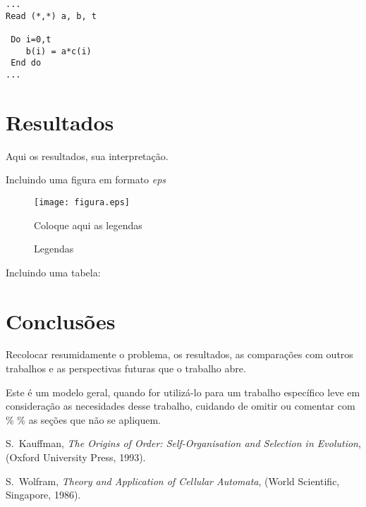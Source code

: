 \begin{verbatim}
...
Read (*,*) a, b, t

 Do i=0,t
    b(i) = a*c(i)
 End do
...

\end{verbatim}

\section{Resultados}
\vspace{2cm}
 Aqui os resultados, sua interpretação.

Incluindo uma figura em formato {\it eps}

\begin{figure}[hbtp]
\begin{center}
\texttt{[image: figura.eps]}
\caption{Coloque aqui as legendas}
\label{fig}
\end{center}
\end{figure}
\vspace{0.5cm}

\begin{figure}[htbp]
\begin{center}
\caption{Legendas}
\label{fig_rotacao}
\end{center}
\end{figure}



Incluindo uma tabela:

\section{Conclusões}
Recolocar resumidamente o problema, os resultados, as comparações \cite{Wolfram_book} com outros
trabalhos e as perspectivas futuras que o trabalho abre.

{\color{red} Este é um modelo geral, quando for utilizá-lo para um trabalho
específico leve em consideração as necesidades desse trabalho,
cuidando de omitir ou comentar com \% \% as seções que não
se apliquem.}

\begin{thebibliography}{99}

S.~Kauffman, {\em The Origins of Order: Self-Organisation and
Selection in Evolution}, (Oxford University Press, 1993).

S.~Wolfram, {\em Theory and Application of Cellular Automata},
(World Scientific, Singapore, 1986).

\end{thebibliography}



